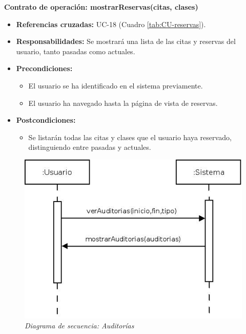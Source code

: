 \textbf{Contrato de operación: mostrarReservas(citas, clases)}
\begin{itemize}
\item \textbf{Referencias cruzadas:} UC-18 (Cuadro \ref{tab:CU-reservas}).
\item \textbf{Responsabilidades:} Se mostrará una lista de las citas y reservas del usuario, tanto pasadas como actuales.
\item \textbf{Precondiciones:} 
 \begin{itemize}
\item El usuario se ha identificado en el sistema previamente.
\item El usuario ha navegado hasta la página de vista de reservas.
\end {itemize}
\item \textbf{Postcondiciones:} 
 \begin{itemize}
\item Se listarán todas las citas y clases que el usuario haya reservado, distinguiendo entre pasadas y actuales.
\end {itemize}
\end {itemize}


\vspace{10mm}

\begin{figure}[H]
\centering
  \includegraphics[scale=.55]{img/secuencias/auditorias.jpeg}
  \caption{\textit{Diagrama de secuencia: Auditorías}}
  \label{fig:secuencia-auditorias}
\end{figure}

